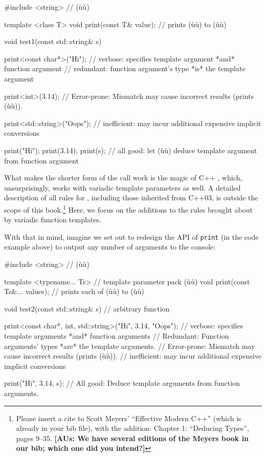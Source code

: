 \begin{emcppslisting}
#include <string>  // (ù{}ù)

template <class T> void print(const T& value);  // prints (ù{}ù) to (ù{}ù)

void test1(const std::string& s)
{
    print<const char*>("Hi");
        // verbose:   specifies template argument *and* function argument
        // redundant: function argument's type *is* the template argument

    print<int>(3.14);
        // Error-prone: Mismatch may cause incorrect results (prints (ù{}ù)).

    print<std::string>("Oops");
        // inefficient: may incur additional expensive implicit conversions

    print("Hi");
    print(3.14);
    print(s);
        // all good: let (ù{}ù) deduce template argument from function argument
}
\end{emcppslisting}
    

\noindent What makes the shorter form of the call work is the magic of C++
, which, unsurprisingly, works with
variadic template parameters as well. A detailed description of all
rules for , including those
inherited from C++03, is outside the scope of this
book.\footnote{Please insert a cite to Scott Meyers'
``Effective Modern C++'' (which is already in your bib file), with the
addition: Chapter 1: ``Deducing Types'', pages 9--35. \textbf{[AUs: We have several editions of the Meyers book in our bib; which one did you intend?]}} Here, we focus on the additions to the
rules brought about by variadic function templates.

With that in mind, imagine we set out to redesign the API of
\lstinline!print! (in the code example above) to output any number of
arguments to the console:

\begin{emcppslisting}
#include <string>  // (ù{}ù)

template <typename... Ts>                // template parameter pack (ù{}ù)
void print(const Ts&... values);         // prints each of (ù{}ù) to (ù{}ù)

void test2(const std::string& s)         // arbitrary function
{
    print<const char*, int, std::string>("Hi", 3.14, "Oops");
        // verbose:     specifies template arguments *and* function arguments
        // Redundant:   Function arguments' types *are* the template arguments.
        // Error-prone: Mismatch may cause incorrect results (prints (ù{}ù)).
        // inefficient: may incur additional expensive implicit conversions

    print("Hi", 3.14, s);
        // All good: Deduce template arguments from function arguments.
}
\end{emcppslisting}
    

